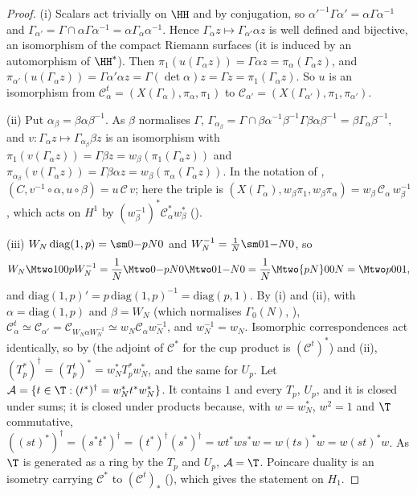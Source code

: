\begin{proof}
(i) Scalars act trivially on $\HH$ and by conjugation, so $\alpha'^{-1}\Gamma\alpha'=\alpha\Gamma\alpha^{-1}$ and $\Gamma_{\alpha'}=\Gamma\cap\alpha\Gamma\alpha^{-1}=\alpha\Gamma_\alpha\alpha^{-1}$. Hence
$\Gamma_\alpha z\mapsto\Gamma_{\alpha'}\alpha z$ is well defined and bijective, an isomorphism of the compact Riemann surfaces (it is induced by an automorphism of $\HH^*$). Then
$\pi_1(u(\Gamma_\alpha z))=\Gamma\alpha z=\pi_\alpha(\Gamma_\alpha z)$, and $\pi_{\alpha'}(u(\Gamma_\alpha z))=\Gamma\alpha'\alpha z=\Gamma(\det\alpha)z=\Gamma z=\pi_1(\Gamma_\alpha z)$. So $u$ is an isomorphism from
$\mathcal C_\alpha^t=(X(\Gamma_\alpha),\pi_\alpha,\pi_1)$ to $\mathcal C_{\alpha'}=(X(\Gamma_{\alpha'}),\pi_1,\pi_{\alpha'})$.

(ii) Put $\alpha_\beta=\beta\alpha\beta^{-1}$. As $\beta$ normalises $\Gamma$, $\Gamma_{\alpha_\beta}=\Gamma\cap\beta\alpha^{-1}\beta^{-1}\Gamma\beta\alpha\beta^{-1}=\beta\Gamma_\alpha\beta^{-1}$, and $v\colon\Gamma_\alpha z\mapsto\Gamma_{\alpha_\beta}\beta z$ is an
isomorphism with $\pi_1(v(\Gamma_\alpha z))=\Gamma\beta z=w_\beta(\pi_1(\Gamma_\alpha z))$ and $\pi_{\alpha_\beta}(v(\Gamma_\alpha z))=\Gamma\beta\alpha z=w_\beta(\pi_\alpha(\Gamma_\alpha z))$. In the notation of ,
$(C,v^{-1}\circ\alpha,u\circ\beta)=u\,\mathcal C\,v$; here the triple is $(X(\Gamma_\alpha),w_\beta\pi_1,w_\beta\pi_\alpha)=w_\beta\,\mathcal C_\alpha\,w_\beta^{-1}$, which acts on $H^1$ by
$(w_\beta^{-1})^*\mathcal C_\alpha^*w_\beta^*$ ().

(iii) $W_N\,\mathrm{diag}(1,p)=\sm0{-p}N0$ and $W_N^{-1}=\frac1N\sm01{-N}0$, so
\[
W_N\Mtwo100p W_N^{-1}=\frac1N\Mtwo0{-p}N0\Mtwo01{-N}0=\frac1N\Mtwo{pN}00N=\Mtwo p001,
\]
and $\mathrm{diag}(1,p)'=p\,\mathrm{diag}(1,p)^{-1}=\mathrm{diag}(p,1)$. By (i) and (ii), with $\alpha=\mathrm{diag}(1,p)$ and $\beta=W_N$ (which normalises $\Gamma_0(N)$, ),
$\mathcal C_\alpha^t\simeq\mathcal C_{\alpha'}=\mathcal C_{W_N\alpha W_N^{-1}}\simeq w_N\mathcal C_\alpha w_N^{-1}$, and $w_N^{-1}=w_N$. Isomorphic correspondences act identically, so by
 (the adjoint of $\mathcal C^*$ for the cup product is $(\mathcal C^t)^*$) and (ii), $(T_p^*)^\dagger=(T_p^t)^*=w_N^*T_p^*w_N^*$, and the same for $U_p$. Let
$\mathcal A=\{t\in\T:(t^*)^\dagger=w_N^*t^*w_N^*\}$. It contains $1$ and every $T_p$, $U_p$, and it is closed under sums; it is closed under products because, with $w=w_N^*$,
$w^2=1$ and $\T$ commutative, $((st)^*)^\dagger=(s^*t^*)^\dagger=(t^*)^\dagger(s^*)^\dagger=wt^*ws^*w=w(ts)^*w=w(st)^*w$. As $\T$ is generated as a ring by the $T_p$ and $U_p$,
$\mathcal A=\T$. Poincare duality is an isometry carrying $\mathcal C^*$ to $(\mathcal C^t)_*$ (), which gives the statement on $H_1$.


\end{proof}
